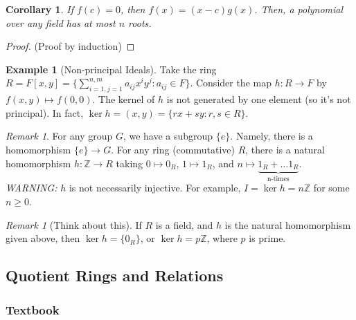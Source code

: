\documentclass[12pt]{article}
\newtheorem{cor}[thm]{Corollary}
\theoremstyle{definition}
\newtheorem{eg}[thm]{Example}
\theoremstyle{remark}
\newtheorem{rmk}[thm]{Remark}
\numberwithin{equation}{section}
\newcommand\Z{\mathbb Z}    %
\begin{document}
\begin{cor}
        If $f(c) = 0$, then $f(x) = (x-c)g(x)$. Then, a polynomial over any field has at most $n$ roots.
\end{cor}
\begin{proof}
        (Proof by induction)
\end{proof}

\vspace{15pt}

\begin{eg}[Non-principal Ideals]
        Take the ring $R = F[x,y] = \{\sum\limits_{i=1,j=1}^{n,m} a_{ij}x^iy^j:a_{ij} \in F\}$. Consider the map $h:R \rightarrow F$ by $f(x,y)\mapsto f(0,0)$. The kernel of $h$ is not generated by one element (so it's not principal). In fact, $\ker h = (x,y) = \{rx+sy:r,s \in R\}$.
\end{eg}


\vspace{15pt}


\begin{rmk}
        For any group $G$, we have a subgroup $\{e\}$. Namely, there is a homomorphism $\{e\}\rightarrow G$. For any ring (commutative) $R$, there is a natural homomorphism $h:\Z\rightarrow R$ taking $0\mapsto 0_R$, $1\mapsto 1_R$, and $n \mapsto \underbrace{1_R+\hdots 1_R}_{\text{n-times}}$. \emph{WARNING:} $h$ is not necessarily injective. For example, $I =\ker h = n\Z$ for some $n \geq 0$.
\end{rmk}

\vspace{15pt}

\begin{rmk}[Think about this]
        If $R$ is a field, and $h$ is the natural homomorphism given above, then $\ker h = \{0_R\}$, or $\ker h = p\Z$, where $p$ is prime.
\end{rmk}

\vspace{15pt}



\subsection{Quotient Rings and Relations}


\subsubsection{Textbook}
\end{document}
